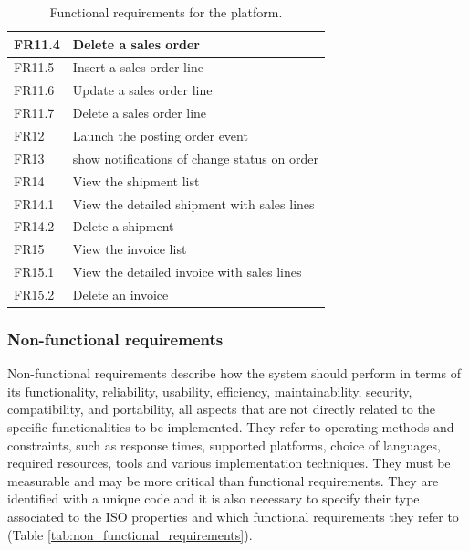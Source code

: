 \begin{table}
\begin{tabular}{|l|p{10cm}|}
        FR11.4 & Delete a sales order                                  \\ \hline
        FR11.5 & Insert a sales order line                             \\ \hline
        FR11.6 & Update a sales order line                             \\ \hline
        FR11.7 & Delete a sales order line                             \\ \hline
        FR12   & Launch the posting order event                        \\ \hline
        FR13   & show notifications of change status on order          \\ \hline
        FR14   & View the shipment list                                \\ \hline
        FR14.1 & View the detailed shipment with sales lines           \\ \hline
        FR14.2 & Delete a shipment                                     \\ \hline
        FR15   & View the invoice list                                 \\ \hline
        FR15.1 & View the detailed invoice with sales lines            \\ \hline
        FR15.2 & Delete an invoice                                     \\ \hline
    \end{tabular}
    \caption{Functional requirements for the platform.}
    \label{tab:functional_requirements}
\end{table}

\subsubsection{Non-functional requirements}
Non-functional requirements describe how the system should perform in terms of its functionality,
reliability, usability, efficiency, maintainability, security, compatibility, and portability, all
aspects that are not directly related to the specific functionalities to be implemented. They refer
to operating methods and constraints, such as response times, supported platforms, choice of
languages, required resources, tools and various implementation techniques. They must be measurable
and may be more critical than functional requirements. They are identified with a unique code and it
is also necessary to specify their type associated to the ISO properties and which functional
requirements they refer to (Table \ref{tab:non_functional_requirements}).

